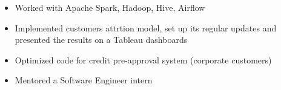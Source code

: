 \begin{itemize}
    \item Worked with Apache Spark, Hadoop, Hive, Airflow
    \item Implemented customers attrtion model, set up its regular updates and presented the results on a Tableau dashboards
    \item Optimized code for credit pre-approval system (corporate customers)
    \item Mentored a Software Engineer intern
\end{itemize}
